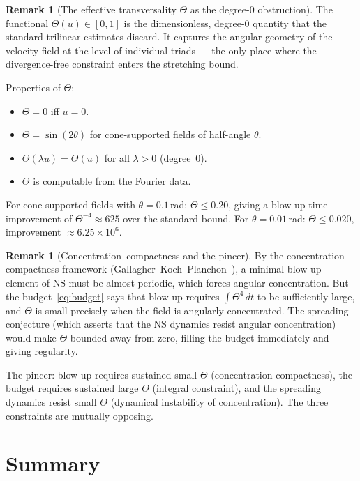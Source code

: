 \documentclass[11pt]{article}
\theoremstyle{definition}
\newtheorem{remark}[theorem]{Remark}
\begin{document}
\begin{remark}[The effective transversality
$\Theta$ as the degree-0 obstruction]
\label{rem:Theta-meaning}
The functional $\Theta(u)\in[0,1]$ is the
dimensionless, degree-0 quantity that the standard
trilinear estimates discard.  It captures the
angular geometry of the velocity field at the
level of individual triads --- the only place where
the divergence-free constraint enters the
stretching bound.

Properties of $\Theta$:
\begin{itemize}[leftmargin=2em]
\item $\Theta=0$ iff $u=0$.
\item $\Theta=\sin(2\theta)$ for cone-supported
  fields of half-angle $\theta$.
\item $\Theta(\lambda u)=\Theta(u)$ for all
  $\lambda>0$ (degree~0).
\item $\Theta$ is computable from the Fourier data.
\end{itemize}

For cone-supported fields with
$\theta=0.1$\,rad: $\Theta\leq 0.20$,
giving a blow-up time improvement of
$\Theta^{-4}\approx 625$ over the standard bound.
For $\theta=0.01$\,rad: $\Theta\leq 0.020$,
improvement $\approx 6.25\times 10^6$.
\end{remark}

\begin{remark}[Concentration--compactness
and the pincer]
\label{rem:conc-compact}
By the concentration-compactness framework
(Gallagher--Koch--Planchon~\cite{GKP2013}), a
minimal blow-up element of NS must be almost
periodic, which forces angular concentration.
But the budget~\eqref{eq:budget}
says that blow-up requires
$\int\Theta^4\,dt$ to be sufficiently large,
and $\Theta$ is small precisely when
the field is angularly concentrated.
The spreading conjecture
(which asserts that the NS dynamics resist
angular concentration) would make $\Theta$
bounded away from zero, filling the budget
immediately and giving regularity.

The pincer: blow-up requires sustained
small $\Theta$ (concentration-compactness),
the budget requires sustained large $\Theta$
(integral constraint), and the spreading
dynamics resist small $\Theta$ (dynamical
instability of concentration).  The three
constraints are mutually opposing.
\end{remark}

\section{Summary}
\end{document}
